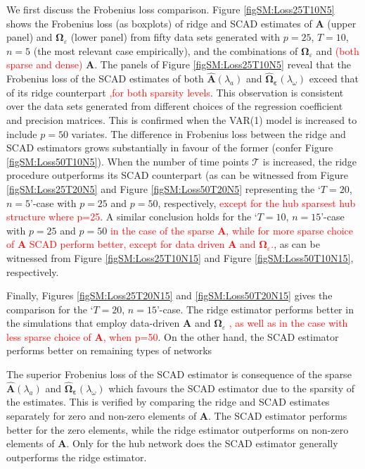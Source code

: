 \documentclass[a4paper,11pt]{article}
\begin{document}
We first discuss the Frobenius loss comparison. Figure \ref{figSM:Loss25T10N5} shows the Frobenius loss (as boxplots) of ridge and SCAD estimates of $\mathbf{A}$ (upper panel) and $\mathbf{\Omega}_{\varepsilon}$ (lower panel) from fifty data sets generated with $p=25$, $T=10$, $n=5$ (the most relevant case empirically), and the combinations of $\mathbf{\Omega}_{\varepsilon}$ and \textcolor{red}{(both sparse and dense)} $\mathbf{A}$. The panels of Figure \ref{figSM:Loss25T10N5} reveal that the Frobenius loss of the SCAD estimates of both  $\mathbf{\hat{A}}(\lambda_a)$ and  $\mathbf{\hat{\Omega}_{\varepsilon}}(\lambda_{\omega})$ exceed that of its ridge counterpart \textcolor{red}{,for both sparsity levels}. This observation is consistent over the data sets generated from different choices of the regression coefficient and precision matrices. This is confirmed when the VAR(1) model is increased to include $p=50$ variates. The difference in Frobenius loss between the ridge and SCAD estimators grows substantially in favour of the former (confer Figure \ref{figSM:Loss50T10N5}). When the number of time points $\mathcal{T}$ is increased, the ridge procedure outperforms its SCAD counterpart (as can be witnessed from Figure \ref{figSM:Loss25T20N5} and Figure \ref{figSM:Loss50T20N5} representing the `$T=20$, $n=5$'-case with $p=25$ and $p=50$, respectively,\textcolor{red}{ except for the hub sparsest hub structure where p=25}. A similar conclusion holds for the `$T=10$, $n=15$'-case with $p=25$ and $p=50$  \textcolor{red}{in the case of the sparse $\mathbf{A}$, while for more sparse choice of $\mathbf{A}$ SCAD perform better, except for data driven  $\mathbf{A}$ and $\boldsymbol{\Omega}_{\varepsilon}$.}, as can be witnessed from Figure \ref{figSM:Loss25T10N15} and Figure \ref{figSM:Loss50T10N15}, respectively.

Finally, Figures \ref{figSM:Loss25T20N15} and \ref{figSM:Loss50T20N15} gives the comparison for the `$T=20$, $n=15$'-case. The ridge estimator performs better in the simulations that employ data-driven $\mathbf{A}$ and $\boldsymbol{\Omega}_{\varepsilon}$ \textcolor{red}{, as well as in the case with less sparse choice of $\mathbf{A}$, when p=50}. On the other hand, the SCAD estimator performs better on remaining types of networks

The superior Frobenius loss of the SCAD estimator is consequence of the sparse $\mathbf{\hat{A}}(\lambda_a)$ and $\boldsymbol{\hat{\Omega}_{\varepsilon}}(\lambda_{\omega})$ which favours the SCAD estimator due to the sparsity of the estimates. This is verified by comparing the ridge and SCAD estimates separately for zero and non-zero elements of $\mathbf{A}$. The SCAD estimator performs better for the zero elements, while the ridge estimator outperforms on non-zero elements of $\mathbf{A}$. Only for the hub network does the SCAD estimator generally outperforms the ridge estimator.
\end{document}
